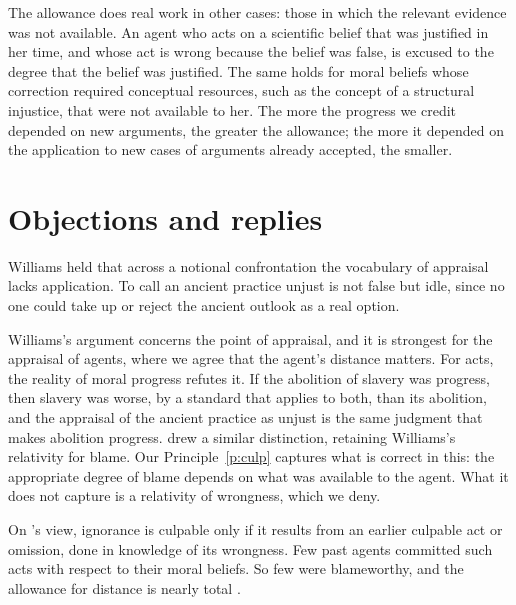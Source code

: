 \documentclass{situationist-preprint}
\begin{document}
The allowance does real work in other cases: those in which the relevant evidence was not available. An agent who acts on a scientific belief that was justified in her time, and whose act is wrong because the belief was false, is excused to the degree that the belief was justified. The same holds for moral beliefs whose correction required conceptual resources, such as the concept of a structural injustice, that were not available to her. The more the progress we credit depended on new arguments, the greater the allowance; the more it depended on the application to new cases of arguments already accepted, the smaller.

\section{Objections and replies}

\begin{objection}
Williams held that across a notional confrontation the vocabulary of appraisal lacks application. To call an ancient practice unjust is not false but idle, since no one could take up or reject the ancient outlook as a real option.
\end{objection}

\begin{reply}
Williams's argument concerns the point of appraisal, and it is strongest for the appraisal of agents, where we agree that the agent's distance matters. For acts, the reality of moral progress refutes it. If the abolition of slavery was progress, then slavery was worse, by a standard that applies to both, than its abolition, and the appraisal of the ancient practice as unjust is the same judgment that makes abolition progress. \citet{Fricker2010} drew a similar distinction, retaining Williams's relativity for blame. Our Principle~\ref{p:culp} captures what is correct in this: the appropriate degree of blame depends on what was available to the agent. What it does not capture is a relativity of wrongness, which we deny.
\end{reply}

\begin{objection}
On \citeauthor{Rosen2003}'s view, ignorance is culpable only if it results from an earlier culpable act or omission, done in knowledge of its wrongness. Few past agents committed such acts with respect to their moral beliefs. So few were blameworthy, and the allowance for distance is nearly total \citep{Rosen2003}.
\end{objection}
\end{document}
